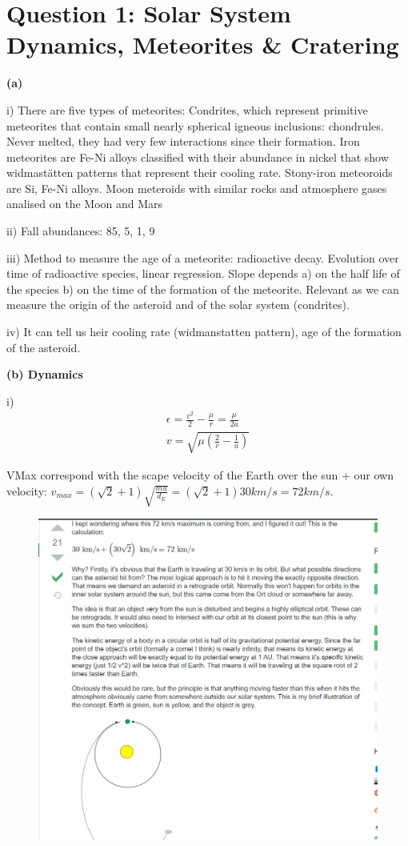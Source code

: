 \section{ Question 1: Solar System Dynamics, Meteorites \& Cratering} \label{sec:q1}    


\textbf{(a)}

i) There are five types of meteorites: Condrites, which represent primitive meteorites that contain small nearly spherical igneous inclusions: chondrules. Never melted, they had very few interactions since their formation. Iron meteorites are Fe-Ni alloys classified with their abundance in nickel that show widmastätten patterns that represent their cooling rate. Stony-iron meteoroids are Si, Fe-Ni alloys. Moon meteroids with similar rocks and atmosphere gases analised on the Moon and Mars

ii) Fall abundances: 85, 5, 1, 9

iii) Method to measure the age of a meteorite: radioactive decay. Evolution over time of radioactive species, linear regression. Slope depends a) on the half life of the species b) on the time of the formation of the meteorite. Relevant as we can measure the origin of the asteroid and of the solar system (condrites). 

iv) It can tell us heir cooling rate (widmanstatten pattern), age of the formation of the asteroid.


\textbf{(b) Dynamics}

i)\begin{align}
	\epsilon = \frac{v^2}{2}-\frac{\mu}{r} = \frac{\mu}{2a} \\
	v = \sqrt{\mu\left(\frac{2}{r}-\frac{1}{a}\right)}
\end{align}

VMax correspond with the scape velocity of the Earth over the sun + our own velocity: $v_{max} = (\sqrt{2}+1) \sqrt{\frac{mu}{d_E}} =(\sqrt{2}+1)30 km/s = 72 km/s $.


\begin{figure}
	\centering
	\includegraphics[width=0.7\linewidth]{pics/1b}
	\caption{}
	\label{fig:1b}
\end{figure}


